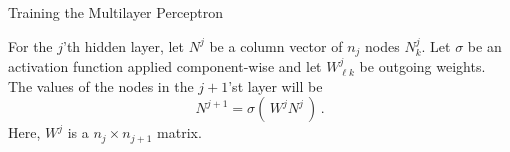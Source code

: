 \documentclass[10pt, table, dvipsnames,xcdraw, handout]{beamer}
\def\layersep{2.5cm}
\begin{document}
\begin{frame}[fragile]{Training the Multilayer Perceptron}
\begin{minipage}[t][0.5\textheight][t]{\textwidth}
  \end{minipage}
  \vfill
\begin{minipage}[t][0.5\textheight][t]{\textwidth}
For the $j$'th hidden layer, let $N^{j}$ be a column vector of $n_j$ nodes $N_{k}^j$. Let $\sigma$ be an activation function applied component-wise and let $W_{\ell k}^j$ be outgoing weights.  The values of the nodes in the $j+1$'st layer will be
$$
N^{j+1} = \sigma\left(\, W^{j}N^{j} \,\right)\,.
$$
Here, $W^j$ is a $n_j\times n_{j+1}$ matrix. 
\end{minipage}
\end{frame}
\end{document}
